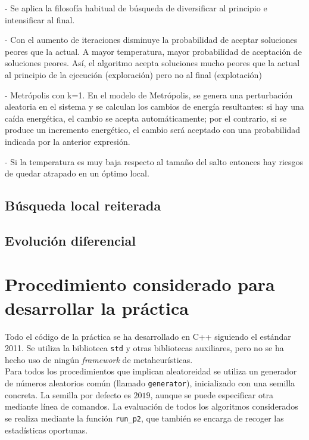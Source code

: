 \documentclass[12pt]{article}
\begin{document}
- Se aplica la filosofía habitual de búsqueda de
diversificar al principio e intensificar al final.

- Con el aumento de iteraciones
disminuye la probabilidad de
aceptar soluciones peores que
la actual. A mayor temperatura, mayor probabilidad de aceptación de
soluciones peores. Así, el algoritmo acepta soluciones mucho
peores que la actual al principio de la ejecución (exploración) pero
no al final (explotación)

- Metrópolis con k=1. En el modelo de Metrópolis, se genera una perturbación aleatoria en el
sistema y se calculan los cambios de energía resultantes: si hay una
caída energética, el cambio se acepta automáticamente; por el contrario,
si se produce un incremento energético, el cambio será aceptado con
una probabilidad indicada por la anterior expresión.

- Si la temperatura es muy baja respecto al tamaño del salto entonces
hay riesgos de quedar atrapado en un óptimo local.

\subsection*{Búsqueda local reiterada}
\label{bl}


\subsection*{Evolución diferencial}
\label{ed}

\newpage
\section{Procedimiento considerado para desarrollar la práctica}

Todo el código de la práctica se ha desarrollado en C++ siguiendo el estándar 2011. Se utiliza la biblioteca \verb|std| y otras bibliotecas auxiliares, pero no se ha hecho uso de ningún \textit{framework} de metaheurísticas.\\

Para todos los procedimientos que implican aleatoreidad se utiliza un generador de números aleatorios común (llamado \verb|generator|), inicializado con una semilla concreta. La semilla por defecto es $2019$, aunque se puede especificar otra mediante línea de comandos. La evaluación de todos los algoritmos considerados se realiza mediante la función \verb|run_p2|, que también se encarga de recoger las estadísticas oportunas.\\
\end{document}
